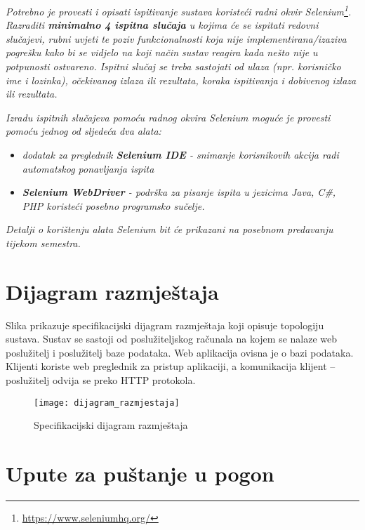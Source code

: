 {			 \textit{Potrebno je provesti i opisati ispitivanje sustava koristeći radni okvir Selenium\footnote{\url{https://www.seleniumhq.org/}}. Razraditi \textbf{minimalno 4 ispitna slučaja} u kojima će se ispitati redovni slučajevi, rubni uvjeti te poziv funkcionalnosti koja nije implementirana/izaziva pogrešku kako bi se vidjelo na koji način sustav reagira kada nešto nije u potpunosti ostvareno. Ispitni slučaj se treba sastojati od ulaza (npr. korisničko ime i lozinka), očekivanog izlaza ili rezultata, koraka ispitivanja i dobivenog izlaza ili rezultata.\\ }
			 
			 \textit{Izradu ispitnih slučajeva pomoću radnog okvira Selenium moguće je provesti pomoću jednog od sljedeća dva alata:}
			 \begin{itemize}
			 	\item \textit{dodatak za preglednik \textbf{Selenium IDE} - snimanje korisnikovih akcija radi automatskog ponavljanja ispita	}
			 	\item \textit{\textbf{Selenium WebDriver} - podrška za pisanje ispita u jezicima Java, C\#, PHP koristeći posebno programsko sučelje.}
			 \end{itemize}
		 	\textit{Detalji o korištenju alata Selenium bit će prikazani na posebnom predavanju tijekom semestra.}
			
			\eject 
		
		
		\section{Dijagram razmještaja}
			
			{Slika prikazuje specifikacijski dijagram razmještaja koji opisuje topologiju sustava. Sustav se sastoji od poslužiteljskog računala na kojem se nalaze web poslužitelj i poslužitelj baze podataka. Web aplikacija ovisna je o bazi podataka. Klijenti koriste web preglednik za pristup aplikaciji, a komunikacija klijent – poslužitelj odvija se preko HTTP protokola.}
			 
			 \begin{figure}[H]
			 	
			 	\texttt{[image: dijagram\_razmjestaja]}
			 	\caption{Specifikacijski dijagram razmještaja}
			 	
			 \end{figure}
			
			\eject 
		
		\section{Upute za puštanje u pogon}
		
}
